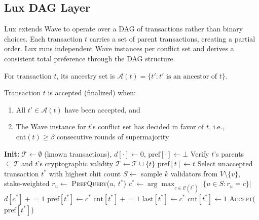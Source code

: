 \subsection{Lux DAG Layer}

Lux extends Wave to operate over a DAG of transactions rather than binary choices.
Each transaction $t$ carries a set of parent transactions, creating a partial order. Lux
runs independent Wave instances per conflict set and derives a consistent total
preference through the DAG structure.

\begin{definition}
For transaction $t$, its ancestry set is $\mathcal{A}(t) = \{t' : t' \text{ is an ancestor of } t\}$.
\end{definition}

\begin{definition}
Transaction $t$ is accepted (finalized) when:
\begin{enumerate}
\item All $t' \in \mathcal{A}(t)$ have been accepted, and
\item The Wave instance for $t$'s conflict set has decided in favor of $t$,
i.e., $\text{cnt}(t) \geq \beta$ consecutive rounds of supermajority
\end{enumerate}
\end{definition}

\begin{algorithm}
\caption{Lux: DAG-Based Consensus}
\label{alg:lux}
\begin{algorithmic}[1]
\State \textbf{Init:} $\mathcal{T} \leftarrow \emptyset$ (known transactions), $d[\cdot] \leftarrow 0$, $\text{pref}[\cdot] \leftarrow \bot$
    \State Verify $t$'s parents $\subseteq \mathcal{T}$ and $t$'s cryptographic validity
    \State $\mathcal{T} \leftarrow \mathcal{T} \cup \{t\}$
    \State $\text{pref}[t] \leftarrow t$ 
\EndProcedure
{}
        \State Select unaccepted transaction $t^*$ with highest chit count
        \State $S \leftarrow$ sample $k$ validators from $V \setminus \{v\}$, stake-weighted
            \State $r_u \leftarrow$ \textsc{PrefQuery}($u$, $t^*$)
        \EndFor
        \State $c^* \leftarrow \arg\max_{c \in \mathcal{C}(t^*)} |\{u \in S : r_u = c\}|$
            \State $d[c^*] \mathrel{+}= 1$
                \State $\text{pref}[t^*] \leftarrow c^*$
            \EndIf
                \State $\text{cnt}[t^*] \mathrel{+}= 1$
            \Else
                \State $\text{last}[t^*] \leftarrow c^*$
                \State $\text{cnt}[t^*] \leftarrow 1$
            \EndIf
                \State \textsc{Accept}($\text{pref}[t^*]$)
            \EndIf
        \EndIf
    \EndWhile
\EndProcedure
\end{algorithmic}
\end{algorithm}

